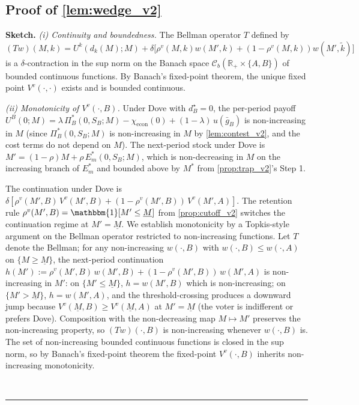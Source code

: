 \documentclass[11pt,twoside]{extarticle}
\newenvironment{proof}[1][Proof]{\noindent \textbf{#1.} }{\ \rule{0.5em}{0.5em}}
\begin{document}
\subsection*{Proof of \autoref{lem:wedge_v2}} \label{app:proof:wedge_v2}

\begin{proof}[Sketch]
\textit{(i) Continuity and boundedness.} The Bellman operator $T$ defined by
\[
(Tw)(M, k) = U^k(d_k(M); M) + \delta\big[\rho^v(M, k) w(M', k) + (1-\rho^v(M, k)) w(M', \tilde k)\big]
\]
is a $\delta$-contraction in the sup norm on the Banach space
$\mathcal{C}_b(\mathbb{R}_+ \times \{A, B\})$ of bounded continuous
functions. By Banach's fixed-point theorem, the unique fixed point
$V^v(\cdot, \cdot)$ exists and is bounded continuous.

\textit{(ii) Monotonicity of $V^v(\cdot, B)$.} Under Dove with
$d_B^\star = 0$, the per-period payoff
$U^B(0; M) = \lambda\,\Pi_B^*(0, S_B; M) - \chi_{\mathrm{econ}}(0) + (1-\lambda)\,u(\bar g_B)$
is non-increasing in $M$ (since $\Pi_B^*(0, S_B; M)$ is non-increasing
in $M$ by \autoref{lem:contest_v2}, and the cost terms do not depend on $M$).
The next-period stock under Dove is
$M' = (1-\rho)M + \rho\,E_m^*(0, S_B; M)$, which is non-decreasing in $M$
on the increasing branch of $E_m^*$ and bounded above by $M^*$ from
\autoref{prop:trap_v2}'s Step 1.

The continuation under Dove is
$\delta[\rho^v(M', B)\,V^v(M', B) + (1 - \rho^v(M', B))\,V^v(M', A)]$.
The retention rule $\rho^v(M', B) = \mathbbm{1}[M' \le \underline M]$
from \autoref{prop:cutoff_v2} switches the continuation regime at
$M' = \underline M$. We establish monotonicity by a Topkis-style
argument on the Bellman operator restricted to non-increasing functions.
Let $T$ denote the Bellman; for any non-increasing $w(\cdot, B)$ with
$w(\cdot, B) \le w(\cdot, A)$ on $\{M \ge \underline M\}$, the next-period
continuation
$h(M') := \rho^v(M', B)\,w(M', B) + (1 - \rho^v(M', B))\,w(M', A)$
is non-increasing in $M'$: on $\{M' \le \underline M\}$, $h = w(M', B)$
which is non-increasing; on $\{M' > \underline M\}$, $h = w(M', A)$, and
the threshold-crossing produces a downward jump because $V^v(\underline M, B)
\ge V^v(\underline M, A)$ at $M' = \underline M$ (the voter is indifferent
or prefers Dove). Composition with the non-decreasing map $M \mapsto M'$
preserves the non-increasing property, so $(Tw)(\cdot, B)$ is
non-increasing whenever $w(\cdot, B)$ is. The set of non-increasing
bounded continuous functions is closed in the sup norm, so by Banach's
fixed-point theorem the fixed-point $V^v(\cdot, B)$ inherits
non-increasing monotonicity.



\end{proof}
\end{document}
